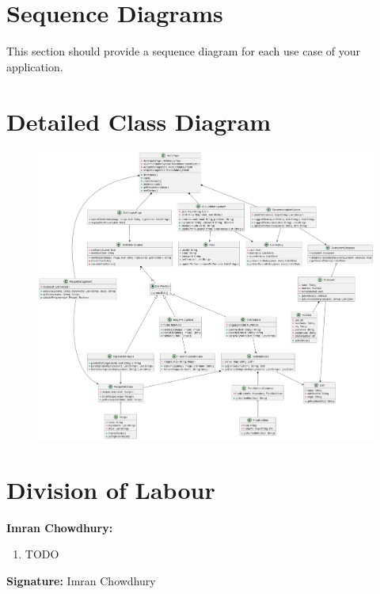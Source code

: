\documentclass[]{article}
\begin{document}

\section{Sequence Diagrams}
\label{sec:sequence_diagrams}
This section should provide a sequence diagram for each use case of your application.

\section{Detailed Class Diagram}
\label{sec:detailed_class_diagram}
\begin{figure}[H]
	\centering
   \includegraphics[width=\textwidth]{image/detailedClassDiagram.png}
\end{figure}


\appendix
\section{Division of Labour}
\label{sec:division_of_labour}
\textbf{Imran Chowdhury:}
\begin{enumerate}
	\item TODO
\end{enumerate}

\textbf{Signature:} Imran Chowdhury \\
\end{document}
